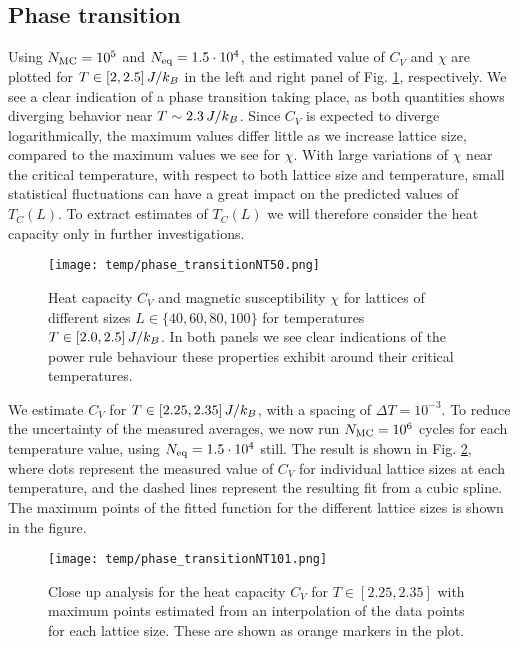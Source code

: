 \subsection{Phase transition}\label{subsec_results:phase_transition}
Using $N_\mathrm{MC}=10^5$ and $N_\mathrm{eq}=1.5\cdot10^4$, the estimated value of $C_V$ and $\chi$ are plotted for $T\in[2,2.5]\,J/k_B$ in the left and right panel of Fig. \ref{fig:phase_transition}, respectively. We see a clear indication of a phase transition taking place, as both quantities shows diverging behavior near $T\sim2.3\,J/k_B$. Since $C_V$ is expected to diverge logarithmically, the maximum values differ little as we increase lattice size, compared to the maximum values we see for $\chi$. With large variations of $\chi$ near the critical temperature, with respect to both lattice size and temperature, small statistical fluctuations can have a great impact on the predicted values of $T_C(L)$. To extract estimates of $T_C(L)$ we will therefore consider the heat capacity only in further investigations. 
\begin{figure*}[!ht]
    \texttt{[image: temp/phase\_transitionNT50.png]} 
    \caption{Heat capacity $C_V$ and magnetic susceptibility $\chi$ for lattices of different sizes $L\in\{40,60,80,100\}$ for temperatures $T\in[2.0,2.5]\,J/k_B$. In both panels we see clear indications of the power rule behaviour these properties exhibit around their critical temperatures.}
    \label{fig:phase_transition}
\end{figure*} 

We estimate $C_V$ for $T\in[2.25,2.35]\,J/k_B$, with a spacing of $\Delta T=10^{-3}$. To reduce the uncertainty of the measured averages, we now run $N_\mathrm{MC}=10^6$ cycles for each temperature value, using $N_\mathrm{eq}=1.5\cdot10^4$ still. The result is shown in Fig. \ref{fig:phase_transition_zoomed}, where dots represent the measured value of $C_V$ for individual lattice sizes at each temperature, and the dashed lines represent the resulting fit from a cubic spline. The maximum points of the fitted function for the different lattice sizes is shown in the figure.    
\begin{figure}[!ht]
    \texttt{[image: temp/phase\_transitionNT101.png]} 
    \caption{Close up analysis for the heat capacity $C_V$ for $T\in[2.25, 2.35]$ with maximum points estimated from an interpolation of the data points for each lattice size. These are shown as orange markers in the plot.}
    \label{fig:phase_transition_zoomed}
\end{figure} 

